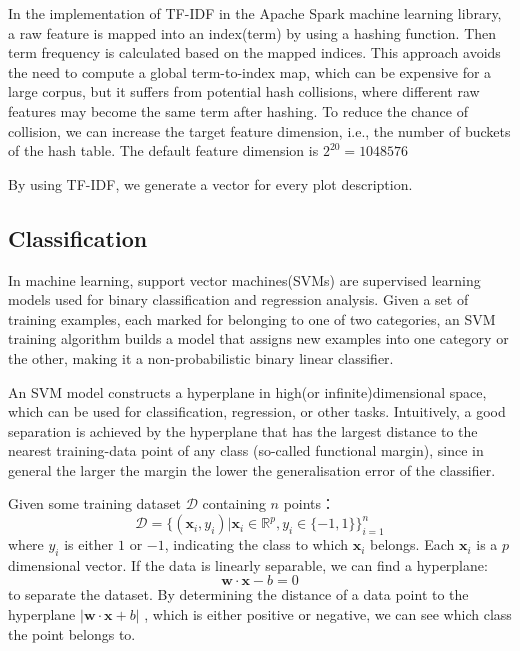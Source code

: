 \documentclass{vldb}
\begin{document}
\par In the implementation of TF-IDF in the Apache Spark machine learning library, a raw feature is mapped into an index(term) by using a hashing function. Then term frequency is calculated based on the mapped indices. This approach avoids the need to compute a global term-to-index map, which can be expensive for a large corpus, but it suffers from potential hash collisions, where different raw features may become the same term after hashing. To reduce the chance of collision, we can increase the target feature dimension, i.e., the number of buckets of the hash table. The default feature dimension is $2^{20}=1048576$
\par By using TF-IDF, we generate a vector for every plot description.


\subsection{Classification}
In machine learning, support vector machines(SVMs)\cite{mining} are supervised learning models used for binary classification and regression analysis. Given a set of training examples, each marked for belonging to one of two categories, an SVM training algorithm builds a model that assigns new examples into one category or the other, making it a non-probabilistic binary linear classifier. 
\par An SVM model constructs a hyperplane in high(or infinite)dimensional space, which can be used for classification, regression, or other tasks. Intuitively, a good separation is achieved by the hyperplane that has the largest distance to the nearest training-data point of any class (so-called functional margin), since in general the larger the margin the lower the generalisation error of the classifier.
\par Given some training dataset $\mathcal{D}$ containing $n$ points：
\begin{displaymath}
\mathcal{D} = \{(\mathbf{x}_i,y_i)|\mathbf{x}_i \in \mathbb{R}^p,y_i\in\{-1,1\}\}^n _{i=1}
\end{displaymath}
where $y_i$ is either $1$ or $-1$, indicating the class to which $\mathbf{x}_i$ belongs. Each $\mathbf{x}_i$ is a $p$ dimensional vector. If the data is linearly separable, we can find a hyperplane:
\begin{displaymath}
\mathbf{w}\cdot\mathbf{x}-b=0 
\end{displaymath}
to separate the dataset. By determining the distance of a data point to the hyperplane $|\mathbf{w}\cdot\mathbf{x}+b|$ , which is either positive or negative, we can see which class the point belongs to.
\end{document}
